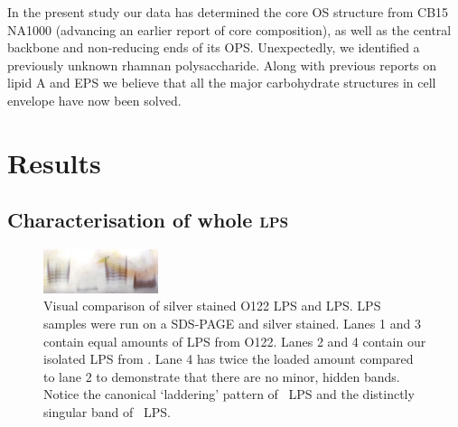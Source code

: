 	In the present study our data has determined the core \ac{OS} structure from \caulobacter CB15
  NA1000 (advancing an earlier report of core composition), as well as the
  central backbone and non-reducing ends of its \ac{OPS}. Unexpectedly, we identified a previously
  unknown rhamnan polysaccharide. Along with previous reports on lipid A
  and \ac{EPS} we believe that all the major carbohydrate structures in
  \caulobacter cell envelope have now been solved.

\section{Results} %
\label{sec:lps_results}
	\subsection{Characterisation of whole \textsc{lps}} %
	\label{sub:characterisation_of_whole_lps}
  \begin{figure}[htb]
    \begin{center}
      \includegraphics[width=0.3\textwidth]{lps_chapter/img/lpssilverstain.jpg}
    \end{center}
    \caption[Visual comparison of \ecoli O122 \ac{LPS} and \caulobacter \ac{LPS}]{Visual comparison
      of silver stained \ecoli O122 \ac{LPS} and \caulobacter \ac{LPS}. \ac{LPS} samples were run on
      a \ac{SDS-PAGE} and silver stained. Lanes 1 and 3 contain equal amounts of \ac{LPS} from
      \ecoli O122. Lanes 2 and 4 contain our isolated \ac{LPS} from \caulobacter. Lane 4 has twice
      the loaded amount compared to lane 2 to demonstrate that there are no minor, hidden
      bands. Notice the canonical `laddering' pattern of \ecoli\ \ac{LPS} and the distinctly
      singular band of \caulobacter\ \ac{LPS}.}
    \label{fig:lpssilverstain}
  \end{figure}

